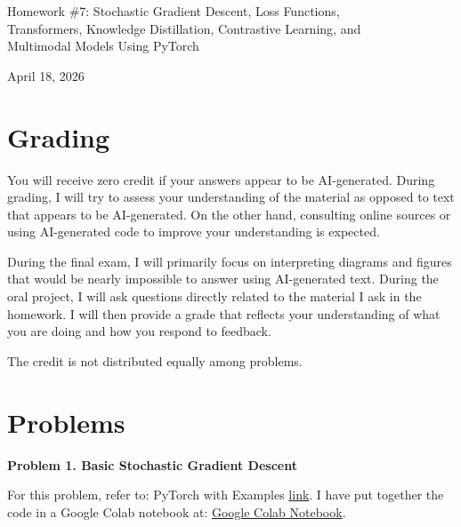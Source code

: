 \documentclass[10pt]{article}
\begin{document}
\begin{center}
    {\LARGE Homework \#7: Stochastic Gradient Descent, Loss Functions,\\
    Transformers, Knowledge Distillation, Contrastive Learning, and\\
    Multimodal Models Using PyTorch}
    
    {\large April 18, 2026}
\end{center}

\section{Grading}

You will receive zero credit if your answers appear to be AI-generated. During grading, I will try to assess your understanding of the material as opposed to text that appears to be AI-generated. On the other hand, consulting online sources or using AI-generated code to improve your understanding is expected.

During the final exam, I will primarily focus on interpreting diagrams and figures that would be nearly impossible to answer using AI-generated text. During the oral project, I will ask questions directly related to the material I ask in the homework. I will then provide a grade that reflects your understanding of what you are doing and how you respond to feedback.

The credit is not distributed equally among problems.

\newpage

\section{Problems}

\textbf{Problem 1. Basic Stochastic Gradient Descent}

For this problem, refer to: PyTorch with Examples \href{https://docs.pytorch.org/tutorials/beginner/pytorch_with_examples.html}{link}. I have put together the code in a Google Colab notebook at: \href{https://colab.research.google.com/drive/1QbopQeqYnZJdslOOJIHGZsHlGaO_Taeo?usp=sharing}{Google Colab Notebook}.
\end{document}
